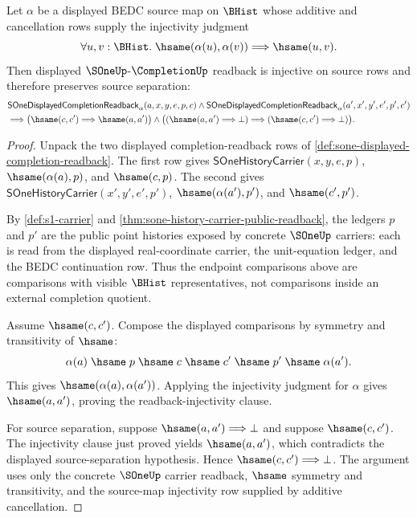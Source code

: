 \begin{proposition}
\label{prop:sone-completion-readback-source-separation}
Let $\alpha$ be a displayed BEDC source map on $\BHist$ whose additive
and cancellation rows supply the injectivity judgment
$$
\forall u,v:\BHist.\;
\hsame(\alpha(u),\alpha(v))\Longrightarrow\hsame(u,v).
$$
Then displayed $\SOneUp$-$\CompletionUp$ readback is injective on source rows
and therefore preserves source separation:
$$
\begin{aligned}
&\mathsf{SOneDisplayedCompletionReadback}_{\alpha}(a,x,y,e,p,c)\land
\mathsf{SOneDisplayedCompletionReadback}_{\alpha}(a',x',y',e',p',c')\\
&\Longrightarrow
\bigl(\hsame(c,c')\Longrightarrow\hsame(a,a')\bigr)\land
\bigl((\hsame(a,a')\Longrightarrow\bot)\Longrightarrow
(\hsame(c,c')\Longrightarrow\bot)\bigr).
\end{aligned}
$$
\end{proposition}
\begin{proof}
Unpack the two displayed completion-readback rows of
\autoref{def:sone-displayed-completion-readback}. The first row gives
$\mathsf{SOneHistoryCarrier}(x,y,e,p)$, $\hsame(\alpha(a),p)$, and
$\hsame(c,p)$. The second gives
$\mathsf{SOneHistoryCarrier}(x',y',e',p')$, $\hsame(\alpha(a'),p')$, and
$\hsame(c',p')$.

By \autoref{def:s1-carrier} and
\autoref{thm:sone-history-carrier-public-readback}, the ledgers $p$ and $p'$
are the public point histories exposed by concrete $\SOneUp$ carriers: each is
read from the displayed real-coordinate carrier, the unit-equation ledger, and
the BEDC continuation row. Thus the endpoint comparisons above are comparisons
with visible $\BHist$ representatives, not comparisons inside an
external completion quotient.

Assume $\hsame(c,c')$. Compose the displayed comparisons by symmetry and
transitivity of $\hsame$:
$$
\alpha(a)\;\hsame\;p\;\hsame\;c\;\hsame\;c'\;\hsame\;p'\;\hsame\;\alpha(a').
$$
This gives $\hsame(\alpha(a),\alpha(a'))$. Applying the injectivity judgment
for $\alpha$ gives $\hsame(a,a')$, proving the readback-injectivity clause.

For source separation, suppose $\hsame(a,a')\Longrightarrow\bot$ and suppose
$\hsame(c,c')$. The injectivity clause just proved yields $\hsame(a,a')$, which
contradicts the displayed source-separation hypothesis. Hence
$\hsame(c,c')\Longrightarrow\bot$. The argument uses only the concrete
$\SOneUp$ carrier readback, $\hsame$ symmetry and transitivity, and the
source-map injectivity row supplied by additive cancellation.
\end{proof}


